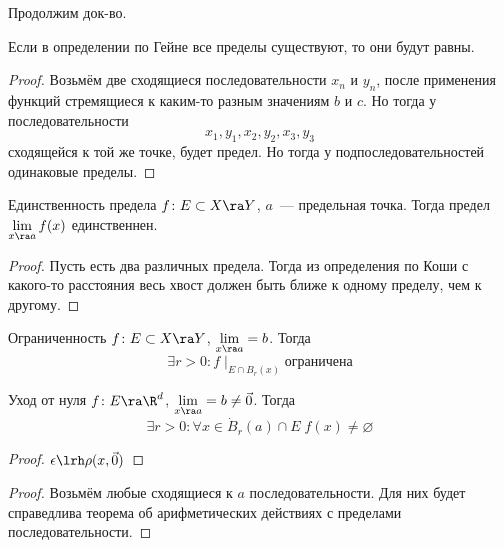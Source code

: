 Продолжим док-во.

\begin{Rem}
Если в определении по Гейне все пределы существуют, то они будут равны.
\end{Rem}
\begin{proof}
Возьмём две сходящиеся последовательности $x_n$ и $y_n$, после применения функций стремящиеся к каким-то разным значениям $b$ и $c$. Но тогда
у последовательности 
$$x_1, y_1, x_2, y_2, x_3, y_3$$
сходящейся к той же точке, будет предел. Но тогда у подпоследовательностей одинаковые пределы.
\end{proof}

\begin{assertion}{Единственность предела}
$f\colon E \subset X \ra Y$, $a$~--- предельная точка. Тогда предел $\lim\limits_{x\ra a} f(x)$ единственнен.
\end{assertion}
\begin{proof}
Пусть есть два различных предела. Тогда из определения по Коши с какого-то расстояния весь хвост должен быть ближе к одному пределу, чем к другому.
\end{proof}

\begin{theorem}{Ограниченность}
$f\colon E \subset X \ra Y$, $\lim\limits_{x\ra a} = b$. Тогда 
$$\exists r>0\colon f \mid_{E \cap B_r(x)}\text{ограничена}$$
\end{theorem}

\begin{theorem}{Уход от нуля}
$f\colon E \ra \R^d$, $\lim\limits_{x\ra a} = b \ne \vec 0$. Тогда
$$\exists r>0\colon \forall x \in \dot B_r(a) \cap E\; f(x) \ne \varnothing$$
\end{theorem}
\begin{proof}
$\epsilon \lrh \rho(x, \vec 0)$
\end{proof}

\begin{proof}
Возьмём любые сходящиеся к $a$ последовательности. Для них будет справедлива теорема об арифметических действиях с пределами последовательности.
\end{proof}

